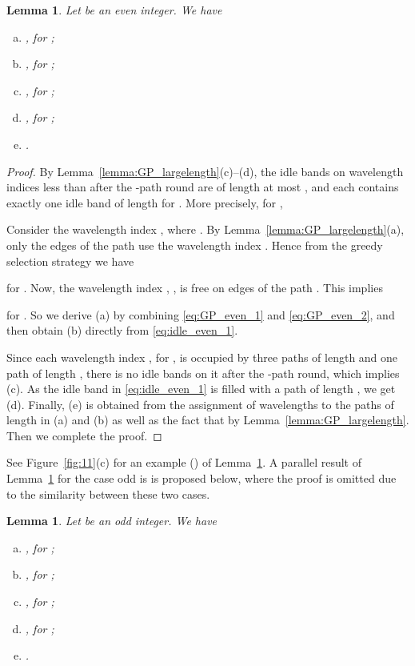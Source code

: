\documentclass[journal,draftcls,onecolumn,12pt,twoside]{IEEEtran}
\newtheorem{lemma}[theorem]{\bf Lemma}
\begin{document}
\medskip

\begin{lemma}\label{lemma:GP_even}
Let  be an even integer.
We have
\begin{enumerate}[(a)]
\item  , for ;
\smallskip
\item , for ;
\smallskip
\item , for ; 
\smallskip
\item , for ;
\smallskip
\item .
\end{enumerate}
\end{lemma}
\begin{proof}
By Lemma~\ref{lemma:GP_largelength}(c)--(d), the idle bands on wavelength indices less than  after the -path round are of length at most , and each  contains exactly one idle band of length  for .
More precisely, for ,

Consider the wavelength index , where .
By Lemma~\ref{lemma:GP_largelength}(a), only the edges of the path  use the wavelength index .
Hence from the greedy selection strategy we have 

for .
Now, the wavelength index , , is free on edges of the path .
This implies

for .
So we derive (a) by combining \eqref{eq:GP_even_1} and \eqref{eq:GP_even_2}, and then obtain (b) directly from \eqref{eq:idle_even_1}.

Since each wavelength index , for , is occupied by three paths of length  and one path of length , there is no idle bands on it after the -path round, which implies (c).
As the idle band  in \eqref{eq:idle_even_1} is filled with a path of length , we get (d).
Finally, (e) is obtained from the assignment of wavelengths to the paths of length  in (a) and (b) as well as the fact that  by Lemma~\ref{lemma:GP_largelength}.
Then we complete the proof.
\end{proof}	

See Figure~\ref{fig:11}(c) for an example () of Lemma~\ref{lemma:GP_even}.
A parallel result of Lemma~\ref{lemma:GP_even} for the case odd is  is proposed below, where the proof is omitted due to the similarity between these two cases.

\begin{lemma}\label{lemma:GP_odd}
Let  be an odd integer.
We have
\begin{enumerate}[(a)]
\item , for ;
\smallskip
\item , for ;
\smallskip
\item , for ; 
\smallskip
\item , for ;
\smallskip
\item .
\end{enumerate}
\end{lemma}
\end{document}
